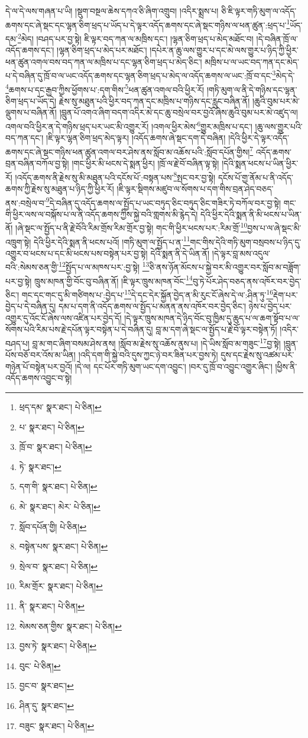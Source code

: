 དེ་ལ་དེ་ལས་གཞན་པ་ཡི། །སྡུག་བསྔལ་ཆེས་དཀའ་ཅི་ཞིག་འགྲུབ། །འདིར་སྨྲས་པ། ཅི་ཇི་ལྟར་གཏི་མུག་ལ་འདོད་ཆགས་དང་ཞེ་སྡང་དང་ལྷན་ཅིག་ཕྲད་པ་ཡོད་པ་དེ་ལྟར་འདོད་ཆགས་དང་ཞེ་སྡང་གཉིས་ལ་ཕན་ཚུན་:ཕྲད་པ་\footnote{ཕྲད་དམ་  སྣར་ཐང་།  པེ་ཅིན། }ཡོད་དམ་\footnote{པ་  སྣར་ཐང་།  པེ་ཅིན། }མེད། །བཤད་པར་བྱ་སྟེ། ཇི་ལྟར་བད་ཀན་ལ་མཁྲིས་དང་། །ལྷན་ཅིག་ཕྲད་པ་མེད་མཐོང་བ། །དེ་བཞིན་ཁྲོ་ལ་འདོད་ཆགས་དང་། །ལྷན་ཅིག་ཕྲད་པ་མེད་པར་མཐོང་། །དཔེར་ན་ཆུ་ལས་གྱུར་པ་དང་མེ་ལས་གྱུར་པ་ཉིད་ཀྱི་ཕྱིར་ཕན་ཚུན་འགལ་བས་བད་ཀན་ལ་མཁྲིས་པ་དང་ལྷན་ཅིག་ཕྲད་པ་མེད་ཅིང་། མཁྲིས་པ་ལ་ཡང་བད་ཀན་དང་མེད་པ་དེ་བཞིན་དུ་ཁྲོ་བ་ལ་ཡང་འདོད་ཆགས་དང་ལྷན་ཅིག་ཕྲད་པ་མེད་ལ་འདོད་ཆགས་ལ་ཡང་:ཁྲོ་བ་དང་\footnote{ཁྲོ་བ་  སྣར་ཐང་།  པེ་ཅིན། }མེད་དེ་\footnote{ཏེ་  སྣར་ཐང་། }ཆགས་པ་དང་རྒྱབ་ཀྱིས་ཕྱོགས་པ་:དག་གིས་\footnote{དག་གི་  སྣར་ཐང་།  པེ་ཅིན། }ཕན་ཚུན་འགལ་བའི་ཕྱིར་རོ། །གཏི་མུག་ལ་ནི་དེ་གཉིས་དང་ལྷན་ཅིག་ཕྲད་པ་ཡོད་དེ། རྗེས་སུ་མཐུན་པའི་ཕྱིར་བད་ཀན་དང་མཁྲིས་པ་གཉིས་དང་རླུང་བཞིན་ནོ། །ཆུའི་བུམ་པར་མེ་ལྡུགས་པ་བཞིན་ནོ། །བླུན་པོ་འགའ་ཞིག་བདག་འདིར་མེ་དང་ཆུ་བསྲེལ་བར་བྱའོ་ཞེས་ཆུའི་བུམ་པར་མེ་འཛུད་ལ། འགལ་བའི་ཕྱིར་ན་དེ་གཉིས་ཕྲད་པར་ཡང་མི་འགྱུར་རོ། །འགལ་ཕྱིར་མེས་\footnote{མེ་  སྣར་ཐང་། མེར་  པེ་ཅིན། }གྱུར་མཁྲིས་པ་དང་། །ཆུ་ལས་གྱུར་པའི་བད་ཀན་དང་། །ཇི་ལྟར་ལྷན་ཅིག་ཕྲད་མེད་ལྟར། །འདོད་ཆགས་ཞེ་སྡང་དག་དེ་བཞིན། །དེའི་ཕྱིར་དེ་ལྟར་འདོད་ཆགས་དང་ཞེ་སྡང་གཉིས་ཕན་ཚུན་འགལ་བར་ཤེས་ནས་སློབ་མ་འཆོས་པའི་:སློབ་དཔོན་གྱིས།\footnote{སློབ་དཔོན་གྱི།  པེ་ཅིན། } འདོད་ཆགས་བྲན་བཞིན་བཀོལ་བྱ་སྟེ། །གང་ཕྱིར་མི་ཕངས་དེ་སྨན་ཕྱིར། །ཁྲོ་ལ་རྗེ་བོ་བཞིན་ལྟ་སྟེ། །དེའི་སྨན་ཕངས་པ་ཡིན་ཕྱིར་རོ། །འདོད་ཆགས་ནི་རྗེས་སུ་མི་མཐུན་པའི་དངོས་པོ་:བསྟན་པས་\footnote{བསྟེན་པས་  སྣར་ཐང་།  པེ་ཅིན། }སྤང་བར་བྱ་སྟེ། དངོས་པོ་གྱ་ནོམ་པ་ནི་འདོད་ཆགས་ཀྱི་རྗེས་སུ་མཐུན་པ་ཉིད་ཀྱི་ཕྱིར་རོ། །ཇི་ལྟར་སྡིགས་མཛུབ་ལ་སོགས་པ་དག་གིས་བྲན་ཤེད་བཅད་ནས་:བསྲེལ་བ་\footnote{སྲེལ་བ་  སྣར་ཐང་།  པེ་ཅིན། }དེ་བཞིན་དུ་འདོད་ཆགས་ལ་སྤྱོད་པ་ཡང་བཏུད་ཅིང་བཏུད་ཅིང་གཟིར་ཏེ་བཀོལ་བར་བྱ་སྟེ། གང་གི་ཕྱིར་ལས་ལ་བསྐོས་པ་ལ་ནི་འདོད་ཆགས་ཀྱིས་སྐྱེ་བའི་གླགས་མི་རྙེད་དེ། དེའི་ཕྱིར་དེའི་སྨན་ནི་མི་ཕངས་པ་ཡིན་ནོ། །ཞེ་སྡང་ལ་སྤྱོད་པ་ནི་རྗེ་བོའི་རིམ་གྲོས་རིམ་གྲོར་བྱ་སྟེ། གང་གི་ཕྱིར་ཕངས་པར་:རིམ་གྲོ་\footnote{རིམ་གྲོར་  སྣར་ཐང་།  པེ་ཅིན། }བྱས་པ་ལ་ཞེ་སྡང་མི་འཁྲུག་སྟེ། དེའི་ཕྱིར་དེའི་སྨན་ནི་ཕངས་པའོ། །གཏི་མུག་ལ་སྤྱོད་པ་ན་\footnote{ནི་  སྣར་ཐང་།  པེ་ཅིན། }གང་གིས་དེའི་གཏི་མུག་བསྲབས་པ་ཉིད་དུ་འགྱུར་བ་ཕངས་པ་དང་མི་ཕངས་པས་བསྟེན་པར་བྱ་སྟེ། དེའི་སྨན་ནི་དེ་ཡིན་ནོ། །དེ་ལྟར་བླ་མས་འདུལ་བའི་:སེམས་ཅན་གྱི་\footnote{སེམས་ཅན་གྱིས་  སྣར་ཐང་།  པེ་ཅིན། }སྤྱོད་པ་ལ་མཁས་པར་:བྱ་སྟེ། \footnote{བྱས་ཏེ་  སྣར་ཐང་།  པེ་ཅིན། }ཅི་ནས་ཉོན་མོངས་པ་སྐྱེ་བར་མི་འགྱུར་བར་སློབ་མ་བཟློག་པར་བྱ་སྟེ། ཁྲུས་མཁན་གྱི་བོང་བུ་བཞིན་ནོ། །ཇི་ལྟར་ཁྲུས་མཁན་བོང་\footnote{བུང་  པེ་ཅིན། }བུ་ཏེ་པོར་ཤེད་བཅད་ནས་འཁོར་བར་བྱེད་ཅིང་། གང་དང་གང་དུ་མི་གཙིགས་པ་:བྱེད་པ་\footnote{བྱང་བ་  སྣར་ཐང་། }དེ་དང་དེར་སྐྱོན་བྱེད་ན་མི་རུང་ངོ་ཞེས་དེ་ལ་:ཤིན་ཏུ་\footnote{ཤིན་དུ་  སྣར་ཐང་། }རྡེག་པར་བྱེད་པ་དེ་བཞིན་དུ། དམ་པ་དག་ནི་འདོད་ཆགས་ལ་སྤྱོད་པ་མནན་ནས་འཁོར་བར་བྱེད་ཅིང་། ཉེས་པ་བྱེད་པར་འགྱུར་དུ་འོང་ངོ་ཞེས་ལས་འཛིན་པར་བྱེད་དོ། །དེ་ལྟར་ཁྲུས་མཁན་དེ་ཉིད་བོང་བུ་ཁྱིམ་དུ་ཆུད་པ་ལ་ཆག་སྟོབ་པ་ལ་སོགས་པའི་རིམ་པས་རྗེ་དཔོན་ལྟར་བསྟེན་པ་དེ་བཞིན་དུ། བླ་མ་དག་ཞེ་སྡང་ལ་སྤྱོད་པ་རྗེ་བོ་ལྟར་བསྟེན་ཏོ། །འདིར་བཤད་པ། བླ་མ་གང་ཞིག་བསམ་ཤེས་ནས། །སློབ་མ་རྗེས་སུ་འཆོས་ནུས་པ། །དེ་ཡིས་སློབ་མ་གཟུང་\footnote{བཟུང་  སྣར་ཐང་།  པེ་ཅིན། }བྱ་སྟེ། །བླུན་པོས་བཅོ་བར་འོས་མ་ཡིན། །འདི་དག་གི་སྐྱེ་བའི་དུས་ཀྱང་ཉེ་བར་ཟིན་པར་བྱས་ཏེ། དུས་དང་རྗེས་སུ་འཚམ་པར་གཉེན་པོ་བསྟེན་པར་བྱའོ། །དེ་ལ། དང་པོར་གཏི་མུག་ཡང་དག་འབྱུང་། །བར་དུ་ཁྲོ་བ་འབྱུང་འགྱུར་ཞིང་། །ཕྱིས་ནི་འདོད་ཆགས་འབྱུང་བ་སྟེ། 
